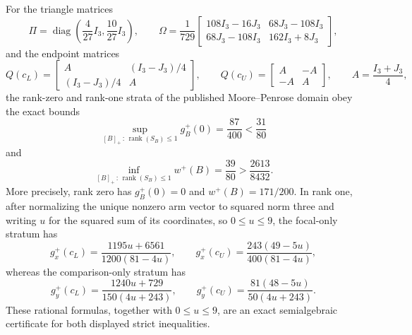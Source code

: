 For the triangle matrices
\[
\Pi=\operatorname{diag}\!\left(\frac4{27}I_3,\frac{10}{27}I_3\right),
\qquad
\Omega=\frac1{729}
\begin{bmatrix}
108I_3-16J_3&68J_3-108I_3\\
68J_3-108I_3&162I_3+8J_3
\end{bmatrix},
\]
and the endpoint matrices
\[
Q(c_L)=
\begin{bmatrix}A&(I_3-J_3)/4\\(I_3-J_3)/4&A\end{bmatrix},
\qquad
Q(c_U)=
\begin{bmatrix}A&-A\\-A&A\end{bmatrix},
\qquad A=\frac{I_3+J_3}{4},
\]
the rank-zero and rank-one strata of the published Moore--Penrose domain obey the exact bounds
\[
\sup_{[B]_+\,:\,\operatorname{rank}(S_B)\le1}g_B^+(0)
=\frac{87}{400}<\frac{31}{80}
\]
and
\[
\inf_{[B]_+\,:\,\operatorname{rank}(S_B)\le1}w^+(B)
=\frac{39}{80}>\frac{2613}{8432}.
\]
More precisely, rank zero has \(g_B^+(0)=0\) and \(w^+(B)=171/200\).  In rank one, after normalizing the unique nonzero arm vector to squared norm three and writing \(u\) for the squared sum of its coordinates, so \(0\le u\le9\), the focal-only stratum has
\[
g_x^+(c_L)=\frac{1195u+6561}{1200(81-4u)},
\qquad
g_x^+(c_U)=\frac{243(49-5u)}{400(81-4u)},
\]
whereas the comparison-only stratum has
\[
g_y^+(c_L)=\frac{1240u+729}{150(4u+243)},
\qquad
g_y^+(c_U)=\frac{81(48-5u)}{50(4u+243)}.
\]
These rational formulas, together with \(0\le u\le9\), are an exact semialgebraic certificate for both displayed strict inequalities.